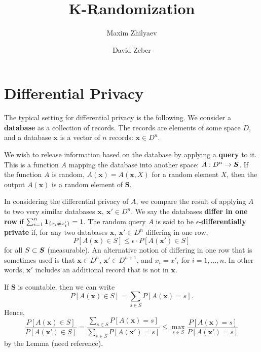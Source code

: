 \documentclass[11pt,draft]{article}
\title{K-Randomization}
\author{Maxim Zhilyaev \and David Zeber}
\begin{document}
\maketitle

\section{Differential Privacy}

The typical setting for differential privacy is the following. 
We consider a \textbf{database} as a collection of records. 
The records are elements of some space $D$, and a database $\boldsymbol{x}$ is a vector of $n$ records: $\boldsymbol{x} \in D^n$.

We wish to release information based on the database by applying a \textbf{query} to it.
This is a function $A$ mapping the database into another space: 
$A:D^n\rightarrow \boldsymbol{S}$. 
If the function $A$ is random, \ie $A(\boldsymbol{x}) = A(\boldsymbol{x}, X)$ for a random element $X$, then the output $A(\boldsymbol{x})$ is a random element of $\boldsymbol{S}$.

In considering the differential privacy of $A$, we compare the result of applying $A$ to two very similar databases $\boldsymbol{x},\ \boldsymbol{x'}
\in D^n$.
We say the databases \textbf{differ in one row} if 
$\sum_{i=1}^n \operatorname{\mathbf{1}}_{\{x_i \neq x'_i\}} = 1$.
The random query $A$ is said to be $\epsilon$-\textbf{differentially private} if, for any two databases $\boldsymbol{x},\ \boldsymbol{x'} \in D^n$ differing in
one row,
\[ P[A(\boldsymbol{x}) \in S] \leq \epsilon \cdot P[A(\boldsymbol{x'}) \in S] \]
for all $S \subset \boldsymbol{S}$ (measurable).
An alternative notion of differing in one row that is sometimes used is that
$\boldsymbol{x} \in D^n$, $\boldsymbol{x'} \in D^{n+1}$,
and $x_i = x'_i$ for $i = 1,\dots,n$.
In other words, $\boldsymbol{x'}$ includes an additional record that is not in $\boldsymbol{x}$.

If $\boldsymbol{S}$ is countable, then we can write 
\[ P[A(\boldsymbol{x}) \in S] = \sum_{s \in S} P[A(\boldsymbol{x}) = s]. \]
Hence, 
\[ \frac{P[A(\boldsymbol{x}) \in S]}{P[A(\boldsymbol{x'}) \in S]} = 
    \frac{\sum_{s \in S} P[A(\boldsymbol{x}) = s]}
    {\sum_{s \in S} P[A(\boldsymbol{x'}) = s]} \leq
\max_{s \in S} \frac{P[A(\boldsymbol{x}) = s]}{P[A(\boldsymbol{x'}) = s]} \]
by the Lemma (need reference).
\end{document}
